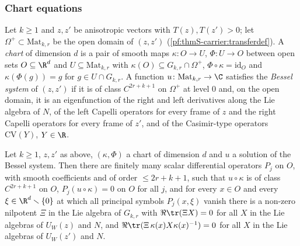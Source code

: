 \subsubsection{Chart equations}

\begin{definition}\label{pf:sh-curv:chartdef}
Let $k\ge1$ and $z,z'$ be anisotropic vectors with $T(z),T(z')>0$; let $\Omega^+\subset\mathrm{Mat}_{k,r}$ be the open
domain of $(z,z')$ (\cref{pf:thmS-carrier:transferdef}). A \emph{chart} of dimension $d$ is a pair of smooth maps
$\kappa\colon O\to U$, $\Phi\colon U\to O$ between open sets $O\subseteq\R^d$ and $U\subseteq\mathrm{Mat}_{k,r}$ with
$\kappa(O)\subseteq G_{k,r}\cap\Omega^+$, $\Phi\circ\kappa=\mathrm{id}_O$ and $\kappa(\Phi(g))=g$ for $g\in U\cap G_{k,r}$. A
function $u\colon\mathrm{Mat}_{k,r}\to\C$ satisfies the \emph{Bessel system} of $(z,z')$ if it is of class $C^{2r+k+1}$ on
$\Omega^+$ at level $0$ and, on the open domain, it is an eigenfunction of the right and left derivatives along the Lie
algebra of $N$, of the left Capelli operators for every frame of $z$ and the right Capelli operators for every frame of
$z'$, and of the Casimir-type operators $\mathrm{CV}(Y)$, $Y\in\R$.
\end{definition}

\begin{theorem}\label{pf:sh-curv:charteq}
Let $k\ge1$, $z,z'$ as above, $(\kappa,\Phi)$ a chart of dimension $d$ and $u$ a solution of the Bessel system. Then there
are finitely many scalar differential operators $P_j$ on $O$, with smooth coefficients and of order $\le2r+k+1$, such that
$u\circ\kappa$ is of class $C^{2r+k+1}$ on $O$, $P_j(u\circ\kappa)=0$ on $O$ for all $j$, and for every $x\in O$ and every
$\xi\in\R^d\smallsetminus\{0\}$ at which all principal symbols $P_j(x,\xi)$ vanish there is a non-zero nilpotent $\Xi$ in the
Lie algebra of $G_{k,r}$ with $\Re\tr(\Xi X)=0$ for all $X$ in the Lie algebras of $U_W(z)$ and $N$, and
$\Re\tr(\Xi\,\kappa(x)X\kappa(x)^{-1})=0$ for all $X$ in the Lie algebras of $U_W(z')$ and $N$.
\end{theorem}

